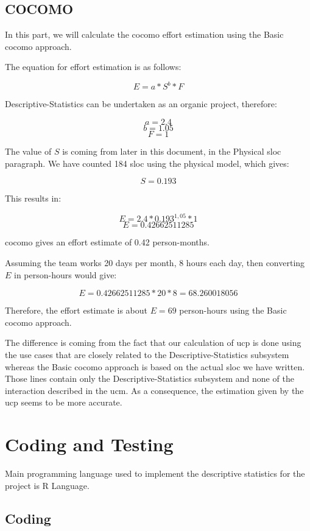 \documentclass[11pt]{article}
\begin{document}
\newpage

\subsection{COCOMO}

In this part, we will calculate the \gls{cocomo} effort estimation using the Basic \gls{cocomo} approach.

The equation for effort estimation is as follows:

$$ E = a*S^b*F $$ 

Descriptive-Statistics can be undertaken as an organic project, therefore:

$$ a = 2.4 $$
$$ b = 1.05 $$
$$ F = 1 $$

The value of $ S $ is coming from later in this document, in the Physical \gls{sloc} paragraph. We have counted 184 \gls{sloc} using the physical model, which gives:

$$ S = 0.193 $$

This results in:

$$ E = 2.4*0.193^{1,05}*1 $$ 
$$ E = 0.42662511285 $$ 

\gls{cocomo} gives an effort estimate of 0.42 person-months.

Assuming the team works 20 days per month, 8 hours each day, then converting $ E $ in person-hours would give:

$$ E = 0.42662511285 * 20 * 8 = 68.260018056 $$

Therefore, the effort estimate is about $ E = 69 $ person-hours using the Basic \gls{cocomo} approach.\newline

The difference is coming from the fact that our calculation of \gls{ucp} is done using the use cases that are closely related to the Descriptive-Statistics subsystem whereas the Basic \gls{cocomo} approach is based on the actual \gls{sloc} we have written. Those lines contain only the Descriptive-Statistics subsystem and none of the interaction described in the \gls{ucm}. As a consequence, the estimation given by the \gls{ucp} seems to be more accurate.
\newpage

\section{Coding and Testing}
Main programming language used to implement the descriptive statistics for the project is R Language.
\subsection{Coding}
\end{document}
